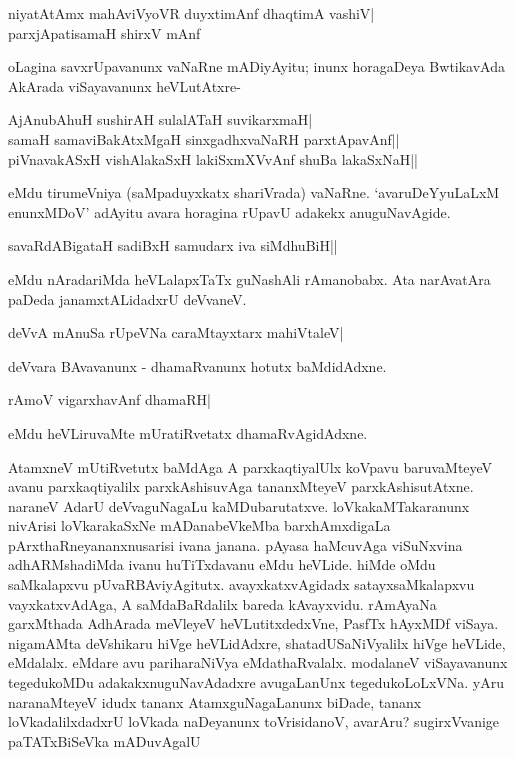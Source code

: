 \begin{shloka}
niyatAtAmx mahAviVyoVR duyxtimAnf dhaqtimA vashiV|\label{247b}\\
parxjApatisamaH shirxV mAnf 
\end{shloka}

oLagina savxrUpavanunx vaNaRne mADiyAyitu; inunx horagaDeya BwtikavAda AkArada viSayavanunx heVLutAtxre-

\begin{shloka}
AjAnubAhuH sushirAH sulalATaH suvikarxmaH|\label{247}\\
samaH samaviBakAtxMgaH sinxgadhxvaNaRH parxtApavAnf||\\
piVnavakASxH vishAlakaSxH lakiSxmXVvAnf shuBa lakaSxNaH||
\end{shloka}

eMdu tirumeVniya (saMpaduyxkatx shariVrada) vaNaRne. `avaruDeYyuLaLxM enunxMDoV' adAyitu avara horagina rUpavU adakekx anuguNavAgide.

\begin{shloka}
savaRdABigataH sadiBxH samudarx iva siMdhuBiH||\label{247e}
\end{shloka}

eMdu nAradariMda heVLalapxTaTx guNashAli rAmanobabx. Ata narAvatAra paDeda janamxtALidadxrU deVvaneV. 

\begin{shloka}
deVvA mAnuSa rUpeVNa caraMtayxtarx mahiVtaleV|\label{247a}
\end{shloka}

deVvara BAvavanunx - dhamaRvanunx hotutx baMdidAdxne.

\begin{shloka}
rAmoV vigarxhavAnf dhamaRH|\label{247d}
\end{shloka}

eMdu heVLiruvaMte mUratiRvetatx dhamaRvAgidAdxne.

AtamxneV mUtiRvetutx baMdAga A parxkaqtiyalUlx koVpavu baruvaMteyeV avanu parxkaqtiyalilx parxkAshisuvAga tananxMteyeV parxkAshisutAtxne. naraneV AdarU deVvaguNagaLu kaMDubarutatxve. loVkakaMTakaranunx nivArisi loVkarakaSxNe mADanabeVkeMba barxhAmxdigaLa pArxthaRneyananxnusarisi ivana janana. pAyasa haMcuvAga viSuNxvina adhARMshadiMda ivanu huTiTxdavanu eMdu heVLide. hiMde oMdu saMkalapxvu pUvaRBAviyAgitutx. avayxkatxvAgidadx satayxsaMkalapxvu vayxkatxvAdAga, A saMdaBaRdalilx bareda kAvayxvidu. rAmAyaNa garxMthada AdhArada meVleyeV heVLutitxdedxVne, PasfTx hAyxMDf viSaya. nigamAMta deVshikaru hiVge heVLidAdxre, shatadUSaNiVyalilx hiVge heVLide, eMdalalx. eMdare avu pariharaNiVya eMdathaRvalalx. modalaneV viSayavanunx tegedukoMDu adakakxnuguNavAdadxre avugaLanUnx tegedukoLoLxVNa. yAru naranaMteyeV idudx tananx AtamxguNagaLanunx biDade, tananx loVkadalilxdadxrU loVkada naDeyanunx toVrisidanoV, avarAru? sugirxVvanige paTATxBiSeVka mADuvAgalU

